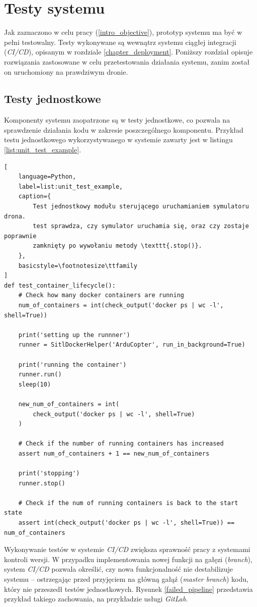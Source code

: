 \chapter{Testy systemu} \label{chapter_tests}

Jak zaznaczono w celu pracy (\ref{intro_objective}), prototyp systemu
ma być w pełni testowalny. Testy wykonywane są wewnątrz systemu ciągłej integracji 
(\textit{CI/CD}), opisanym w rozdziale \ref{chapter_deployment}. Poniższy rozdział opisuje
rozwiązania zastosowane w celu przetestowania działania systemu,
zanim został on uruchomiony na prawdziwym dronie.

\section{Testy jednostkowe}

Komponenty systemu zaopatrzone są w testy jednostkowe, co pozwala na
sprawdzenie działania kodu w zakresie poszczególnego komponentu.
Przykład testu jednostkowego wykorzystywanego w systemie
zawarty jest w listingu \ref{list:unit_test_example}.

\begin{lstlisting}[
    language=Python,
    label=list:unit_test_example,
    caption={
        Test jednostkowy modułu sterującego uruchamianiem symulatoru drona.
        test sprawdza, czy symulator uruchamia się, oraz czy zostaje poprawnie
        zamknięty po wywołaniu metody \texttt{.stop()}.
    },
    basicstyle=\footnotesize\ttfamily
]
def test_container_lifecycle():
	# Check how many docker containers are running
	num_of_containers = int(check_output('docker ps | wc -l', shell=True))

	print('setting up the runnner')
	runner = SitlDockerHelper('ArduCopter', run_in_background=True)

	print('running the container')
	runner.run()
	sleep(10)

	new_num_of_containers = int(
        check_output('docker ps | wc -l', shell=True)
    )

	# Check if the number of running containers has increased
	assert num_of_containers + 1 == new_num_of_containers

	print('stopping')
	runner.stop()

	# Check if the num of running containers is back to the start state
	assert int(check_output('docker ps | wc -l', shell=True)) == num_of_containers
\end{lstlisting}

Wykonywanie testów w systemie \textit{CI/CD} zwiększa sprawność
pracy z systemami kontroli wersji. W przypadku implementowania nowej 
funkcji na gałęzi (\textit{branch}), system \textit{CI/CD} pozwala określić,
czy nowa funkcjonalność nie destabilizuje systemu -- ostrzegając przed 
przyjęciem na główną gałąź (\textit{master branch}) kodu, który nie przeszedł
testów jednostkowych. Rysunek \ref{failed_pipeline} przedstawia przykład takiego zachowania,
na przykładzie usługi \textit{GitLab}.

